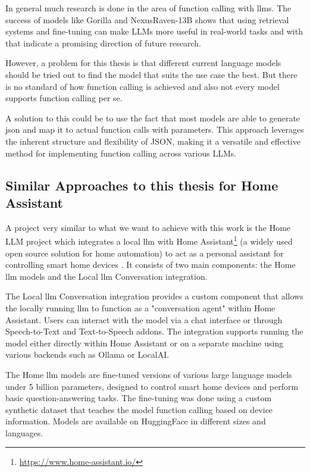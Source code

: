In general much research is done in the area of function calling with \glspl{llm}.
The success of models like Gorilla and NexusRaven-13B shows that using retrieval systems and fine-tuning can make LLMs more useful in real-world tasks and with that indicate a promising direction of future research.

However, a problem for this thesis is that different current language models should be tried out to find the model that suits the use case the best. But there is no standard of how function calling is achieved and also not every model supports function calling per se.

A solution to this could be to use the fact that most models are able to generate \gls{json} and map it to actual function calls with parameters. This approach leverages the inherent structure and flexibility of JSON, making it a versatile and effective method for implementing function calling across various LLMs.

\subsection{Similar Approaches to this thesis for Home Assistant}
A project very similar to what we want to achieve with this work is the Home LLM project which integrates a local \gls{llm} with Home Assistant\footnote{\url{https://www.home-assistant.io/}} (a widely used open source solution for home automation) to act as a personal assistant for controlling smart home devices \cite{acon96_home_llm}. It consists of two main components: the Home \gls{llm} models and the Local \gls{llm} Conversation integration.

The Local \gls{llm} Conversation integration provides a custom component that allows the locally running \gls{llm} to function as a "conversation agent" within Home Assistant. Users can interact with the model via a chat interface or through Speech-to-Text and Text-to-Speech addons. The integration supports running the model either directly within Home Assistant or on a separate machine using various backends such as Ollama or LocalAI.

The Home \gls{llm} models are fine-tuned versions of various large language models under 5 billion parameters, designed to control smart home devices and perform basic question-answering tasks. The fine-tuning was done using a custom synthetic dataset that teaches the model function calling based on device information. Models are available on HuggingFace in different sizes and languages.

